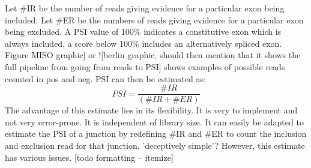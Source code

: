 Let \#IR be the number of reads giving evidence for a particular exon being included. Let \#ER be the numbers of reads giving evidence for a particular exon being excluded. A PSI value of 100\% indicates a constitutive exon which is always included, a score below 100\% includes an alternatively spliced exon. Figure MISO graphic] or ![berlin graphic, should then mention that it shows the full pipeline from going from reads to PSI] shows examples of possible reads counted in pos and neg. PSI can then be estimated as:
$$PSI = \frac{\#IR}{(\#IR+\#ER)}$$
The advantage of this estimate lies in its flexibility. It is very to implement and not very error-prone. It is independent of library size. It can easily be adapted to estimate the PSI of a junction by redefining \#IR and \#ER to count the inclusion and exclusion read for that junction.
'deceptively simple'?
However, this estimate has various issues. [todo formatting -- itemize]
